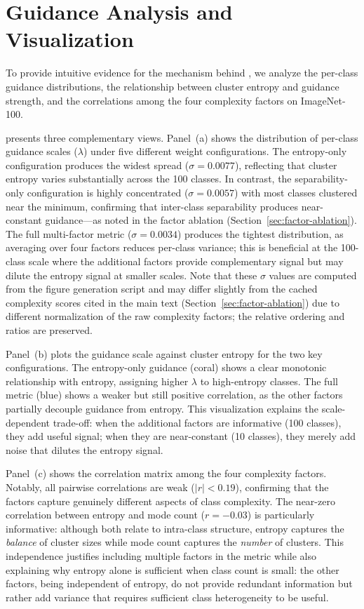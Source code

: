 \section{Guidance Analysis and Visualization}
\label{sec:guidance-analysis}

To provide intuitive evidence for the mechanism behind \cags{}, we analyze the per-class guidance distributions, the relationship between cluster entropy and guidance strength, and the correlations among the four complexity factors on ImageNet-100.

 presents three complementary views. Panel~(a) shows the distribution of per-class guidance scales ($\lambda$) under five different weight configurations. The entropy-only configuration produces the widest spread ($\sigma = 0.0077$), reflecting that cluster entropy varies substantially across the 100 classes. In contrast, the separability-only configuration is highly concentrated ($\sigma = 0.0057$) with most classes clustered near the minimum, confirming that inter-class separability produces near-constant guidance---as noted in the factor ablation (Section~\ref{sec:factor-ablation}). The full multi-factor \cags{} metric ($\sigma = 0.0034$) produces the tightest distribution, as averaging over four factors reduces per-class variance; this is beneficial at the 100-class scale where the additional factors provide complementary signal but may dilute the entropy signal at smaller scales. Note that these $\sigma$ values are computed from the figure generation script and may differ slightly from the cached complexity scores cited in the main text (Section~\ref{sec:factor-ablation}) due to different normalization of the raw complexity factors; the relative ordering and ratios are preserved.

Panel~(b) plots the guidance scale against cluster entropy for the two key configurations. The entropy-only guidance (coral) shows a clear monotonic relationship with entropy, assigning higher $\lambda$ to high-entropy classes. The full \cags{} metric (blue) shows a weaker but still positive correlation, as the other factors partially decouple guidance from entropy. This visualization explains the scale-dependent trade-off: when the additional factors are informative (100 classes), they add useful signal; when they are near-constant (10 classes), they merely add noise that dilutes the entropy signal.

Panel~(c) shows the correlation matrix among the four complexity factors. Notably, all pairwise correlations are weak ($|r| < 0.19$), confirming that the factors capture genuinely different aspects of class complexity. The near-zero correlation between entropy and mode count ($r = -0.03$) is particularly informative: although both relate to intra-class structure, entropy captures the \emph{balance} of cluster sizes while mode count captures the \emph{number} of clusters. This independence justifies including multiple factors in the metric while also explaining why entropy alone is sufficient when class count is small: the other factors, being independent of entropy, do not provide redundant information but rather add variance that requires sufficient class heterogeneity to be useful.

